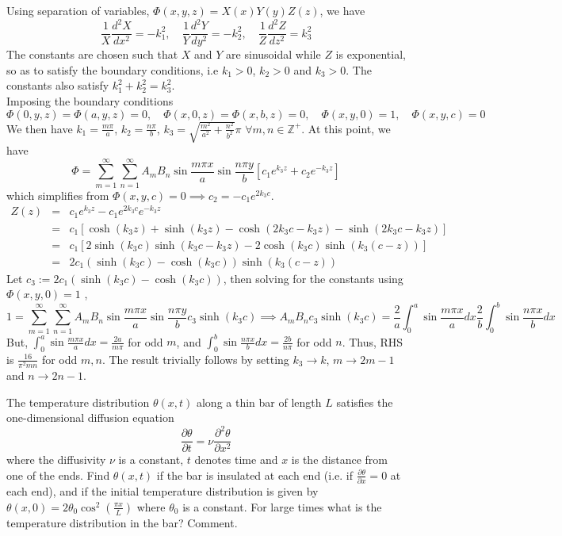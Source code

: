 \documentclass[a4paper]{article}
\begin{document}
\begin{ans}Using separation of variables, $\Phi(x,y,z)=X(x)Y(y)Z(z)$, we have 
$$\frac{1}{X}\frac{d^2X}{dx^2}=-k_1^2,\quad\frac{1}{Y}\frac{d^2Y}{dy^2}=-k_2^2,\quad\frac{1}{Z}\frac{d^2Z}{dz^2}=k_3^2$$
The constants are chosen such that $X$ and $Y$ are sinusoidal while $Z$ is exponential, so as to satisfy the boundary conditions, i.e $k_1>0$, $k_2>0$ and $k_3>0$. The constants also satisfy $k_1^2+k_2^2=k_3^2$.\\[5pt]
Imposing the boundary conditions 
\begin{equation}
    \Phi(0,y,z)=\Phi(a,y,z)=0,\quad \Phi(x,0,z)=\Phi(x,b,z)=0,\quad \Phi(x,y,0)=1,\quad \Phi(x,y,c)=0\tag{b.c.s}
\end{equation}
We then have $k_1=\frac{m\pi}{a}$, $k_2=\frac{n\pi}{b}$, $k_3=\sqrt{\frac{m^2}{a^2}+\frac{n^2}{b^2}}\pi$ $\forall m,n\in\mathbb{Z}^+$. At this point, we have
$$\Phi=\sum_{m=1}^\infty\sum_{n=1}^\infty A_mB_n\sin\frac{m\pi x}{a}\sin\frac{n\pi y}{b}[c_1e^{k_3z}+c_2e^{-k_3z}]$$
which simplifies from $\Phi(x,y,c)=0\implies c_2=-c_1e^{2k_3c}$.
\begin{eqnarray}
Z(z)&=&c_1e^{k_3z}-c_1e^{2k_3c}e^{-k_3z}\nonumber\\&=& c_1[\cosh(k_3z)+\sinh(k_3z)-\cosh(2k_3c-k_3z)-\sinh(2k_3c-k_3z)]\nonumber\\&=&c_1[2\sinh(k_3c)\sinh(k_3c-k_3z)-2\cosh(k_3c)\sinh(k_3(c-z))]\nonumber\\&=&2c_1(\sinh(k_3c)-\cosh(k_3c))\sinh(k_3(c-z))\nonumber
\end{eqnarray}
Let $c_3:=2c_1(\sinh(k_3c)-\cosh(k_3c))$, then solving for the constants using $\Phi(x,y,0)=1$ ,
$$1=\sum_{m=1}^\infty\sum_{n=1}^\infty A_mB_n\sin\frac{m\pi x}{a}\sin\frac{n\pi y}{b}c_3\sinh(k_3c)\implies A_mB_nc_3\sinh(k_3c)=\frac{2}{a}\int_0^a\sin\frac{m\pi x}{a}dx\frac{2}{b}\int_0^b\sin\frac{n\pi x}{b}dx$$
But, $\int_0^a\sin\frac{m\pi x}{a}dx=\frac{2a}{m\pi}$ for odd $m$, and $\int_0^b\sin\frac{n\pi x}{b}dx=\frac{2b}{n\pi}$ for odd $n$. Thus, RHS is $\frac{16}{\pi^2mn}$ for odd $m,n$. The result trivially follows by setting $k_3\rightarrow k$, $m\rightarrow 2m-1$ and $n\rightarrow 2n-1$.
\end{ans}
\begin{qns}
The temperature distribution $\theta(x,t)$ along a thin bar of length $L$ satisfies the one-dimensional diffusion equation
$$\frac{\partial\theta}{\partial t}=\nu\frac{\partial^2\theta}{\partial x^2}$$
where the diffusivity $\nu$ is a constant, $t$ denotes time and $x$ is the distance from one of the ends. Find $\theta(x,t)$ if the bar is insulated at each end (i.e. if $\frac{\partial\theta}{\partial x}=0$ at each end), and if the initial temperature distribution is given by
$\theta(x,0)=2\theta_0\cos^2(\frac{\pi x}{L})$ where $\theta_0$ is a constant. For large times what is the temperature distribution in the bar? Comment.
\end{qns}
\end{document}
